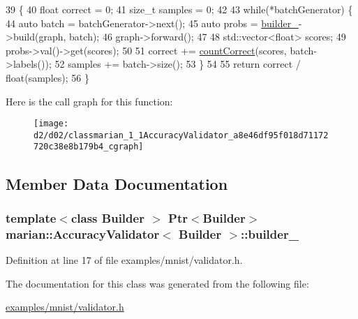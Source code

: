 \begin{DoxyCode}
39                                                          \{
40     \textcolor{keywordtype}{float} correct = 0;
41     \textcolor{keywordtype}{size\_t} samples = 0;
42 
43     \textcolor{keywordflow}{while}(*batchGenerator) \{
44       \textcolor{keyword}{auto} batch = batchGenerator->next();
45       \textcolor{keyword}{auto} probs = \hyperlink{classmarian_1_1AccuracyValidator_a59e125240f227510422cb36e315d242c}{builder\_}->build(graph, batch);
46       graph->forward();
47 
48       std::vector<float> scores;
49       probs->val()->get(scores);
50 
51       correct += \hyperlink{classmarian_1_1AccuracyValidator_a8d6ee9daf8781fabfdb72daaaecff191}{countCorrect}(scores, batch->labels());
52       samples += batch->size();
53     \}
54 
55     \textcolor{keywordflow}{return} correct / float(samples);
56   \}
\end{DoxyCode}


Here is the call graph for this function\+:
\nopagebreak
\begin{figure}[H]
\begin{center}
\leavevmode
\texttt{[image: d2/d02/classmarian\_1\_1AccuracyValidator\_a8e46df95f018d71172720c38e8b179b4\_cgraph]}
\end{center}
\end{figure}




\subsection{Member Data Documentation}
\subsubsection[{\texorpdfstring{builder\+\_\+}{builder_}}]{\setlength{\rightskip}{0pt plus 5cm}template$<$class Builder $>$ {\bf Ptr}$<$Builder$>$ {\bf marian\+::\+Accuracy\+Validator}$<$ Builder $>$\+::builder\+\_\+\hspace{0.3cm}{\ttfamily [private]}}\hypertarget{classmarian_1_1AccuracyValidator_a59e125240f227510422cb36e315d242c}{}\label{classmarian_1_1AccuracyValidator_a59e125240f227510422cb36e315d242c}


Definition at line 17 of file examples/mnist/validator.\+h.



The documentation for this class was generated from the following file\+:\begin{DoxyCompactItemize}
\item 
\hyperlink{examples_2mnist_2validator_8h}{examples/mnist/validator.\+h}\end{DoxyCompactItemize}
